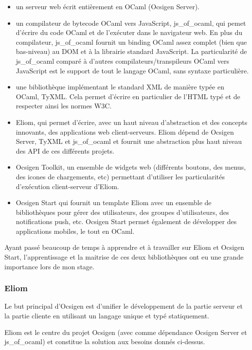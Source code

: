 \begin{itemize}
  \item un serveur web écrit entièrement en OCaml (Ocsigen Server\cite{ocsigen-server-github}).
  \item un compilateur de bytecode OCaml vers JavaScript, js\_of\_ocaml\cite{ocsigen-js-of-ocaml-github}, qui
    pemet d'écrire du code OCaml et de l'exécuter dans le navigateur web. En
plus du compilateur, js\_of\_ocaml fournit un binding OCaml assez complet (bien
que bas-niveau) au DOM et à la librairie standard JavaScript. La particularité
de js\_of\_ocaml comparé à d'autres compilateurs/transpileurs OCaml vers
JavaScript est le support de tout le langage OCaml, sans syntaxe particulière.
  \item une bibliothèque implémentant le standard XML de manière typée en OCaml,
TyXML\cite{ocsigen-tyxml-github}. Cela permet d'écrire en particulier de l'HTML
typé et de respecter ainsi les normes W3C.
  \item Eliom, qui permet d'écrire, avec un haut niveau
    d'abstraction et des concepts innovants, des applications web
client-serveurs. Eliom dépend de Ocsigen Server, TyXML et js\_of\_ocaml et
fournit une abstraction plus haut niveau des API de ces différents projets.
  \item Ocsigen Toolkit, un ensemble de widgets web (différents boutons, des
    menus, des icones de chargements, etc) permettant d'utiliser les
    particularités d'exécution client-serveur d'Eliom.
  \item Ocsigen Start qui fournit un template Eliom avec un ensemble de
    bibliothèques pour gérer des utilisateurs, des groupes d'utilisateurs, des
    notifications push, etc. Ocsigen Start permet également de développer des
    applications mobiles, le tout en OCaml.
\end{itemize}

Ayant passé beaucoup de temps à apprendre et à travailler sur Eliom et Ocsigen
Start, l'apprentissage et la maitrise de ces deux bibliothèques ont eu une
grande importance lors de mon stage. 

\subsubsection*{Eliom}

Le but principal d'Ocsigen est d'unifier le développement de la partie serveur
et la partie cliente en utilisant un langage unique et typé statiquement.

Eliom est le centre du projet Ocsigen (avec comme dépendance Ocsigen Server et
js\_of\_ocaml) et constitue la solution aux besoins donnés ci-dessus.

